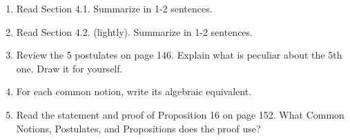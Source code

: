 \documentclass[12pt]{article}
\begin{document}
\begin{enumerate}
\item Read Section 4.1. Summarize in 1-2 sentences.
\vfill
\item Read Section 4.2. (lightly). Summarize in 1-2 sentences.
\vfill
\item Review the 5 postulates on page 146. Explain what is peculiar about the 5th one. Draw it for yourself.
\vfill
\item For each common notion, write its algebraic equivalent.
\vfill
\item Read the statement and proof of Proposition 16 on page 152. What Common Notions, Postulates, and Propositions does the proof use?
\vfill 
\end{enumerate}
\end{document}
